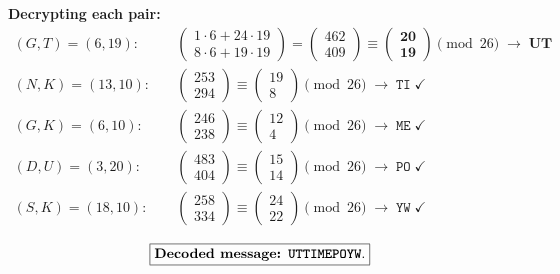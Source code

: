 \documentclass[12pt,a3paper]{article}
\begin{document}
\begin{tcolorbox}
\textbf{Decrypting each pair:}
\begin{align*}
  (G,T)=(6,19):&\quad
  \begin{pmatrix}1\cdot6+24\cdot19\\8\cdot6+19\cdot19\end{pmatrix}
  =\begin{pmatrix}462\\409\end{pmatrix}
  \equiv\begin{pmatrix}\mathbf{20}\\\mathbf{19}\end{pmatrix}\pmod{26}
  \;\to\; \mathbf{UT}
  \\[6pt]
  (N,K)=(13,10):&\quad
  \begin{pmatrix}253\\294\end{pmatrix}
  \equiv\begin{pmatrix}19\\8\end{pmatrix}\pmod{26}\;\to\;\texttt{TI}\;\checkmark
  \\[6pt]
  (G,K)=(6,10):&\quad
  \begin{pmatrix}246\\238\end{pmatrix}
  \equiv\begin{pmatrix}12\\4\end{pmatrix}\pmod{26}\;\to\;\texttt{ME}\;\checkmark
  \\[6pt]
  (D,U)=(3,20):&\quad
  \begin{pmatrix}483\\404\end{pmatrix}
  \equiv\begin{pmatrix}15\\14\end{pmatrix}\pmod{26}\;\to\;\texttt{PO}\;\checkmark
  \\[6pt]
  (S,K)=(18,10):&\quad
  \begin{pmatrix}258\\334\end{pmatrix}
  \equiv\begin{pmatrix}24\\22\end{pmatrix}\pmod{26}\;\to\;\texttt{YW}\;\checkmark
\end{align*}

\[
  \boxed{\textbf{Decoded message: \texttt{UTTIMEPOYW}}.}
\]
\end{tcolorbox}
\end{document}
